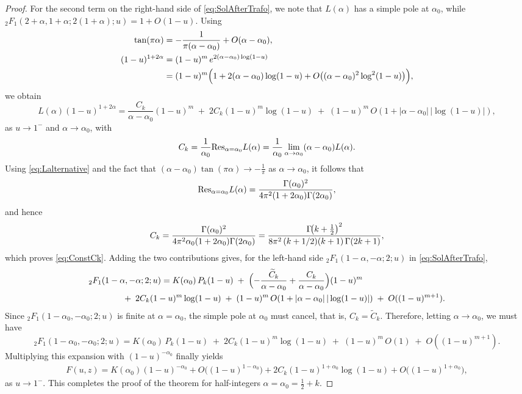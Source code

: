 \documentclass[11pt,a4paper]{article}
\numberwithin{equation}{section}
\begin{document}
\begin{proof}
For the second term on the right-hand side of \eqref{eq:SolAfterTrafo}, we note that $L(\alpha)$ has a simple pole at $\alpha_0$, while ${}_2F_1(2+\alpha,1+\alpha;2(1+\alpha);u)=1+O(1-u)$. Using
\begin{align*}
    \tan(\pi\alpha) &= -\frac{1}{\pi(\alpha-\alpha_0)}+ O(\alpha-\alpha_0),\\
    (1-u)^{1+2\alpha} &= (1-u)^m\,e^{2(\alpha-\alpha_0)\log(1-u)} \\
    &= (1-u)^m\Bigl(1+2(\alpha-\alpha_0)\log(1-u)+O\bigl((\alpha-\alpha_0)^2\log^2(1-u)\bigr)\Bigr),
\end{align*}
we obtain
\begin{equation*}
L(\alpha)(1-u)^{1+2\alpha}
= \frac{C_k}{\alpha-\alpha_0}(1-u)^m \;+\; 2C_k(1-u)^m\log(1-u)
\;+\; (1-u)^m\,O(1+|\alpha-\alpha_0|\,|\log(1-u)|),
\end{equation*}
as $u\to 1^-$ and $\alpha\to\alpha_0$, with
\begin{align*}
C_k={1\over\alpha_0}{\rm Res}_{\alpha=\alpha_0}L(\alpha) = {1\over\alpha_0}\lim_{\alpha\to\alpha_0}(\alpha-\alpha_0)L(\alpha).
\end{align*}
Using \eqref{eq:Lalternative} and the fact that $(\alpha-\alpha_0)\tan(\pi\alpha)\to -\tfrac{1}{\pi}$ as $\alpha\to\alpha_0$, it follows that
$$
{\rm Res}_{\alpha=\alpha_0}L(\alpha) = {\Gamma(\alpha_0)^2\over 4\pi^2(1+2\alpha_0)\Gamma(2\alpha_0)},
$$
and hence
$$
C_k = {\Gamma(\alpha_0)^2\over 4\pi^2\alpha_0(1+2\alpha_0)\Gamma(2\alpha_0)} =\frac{\Gamma\!\bigl(k+\tfrac12\bigr)^2}{8\pi^2\,(k+1/2)(k+1)\,\Gamma(2k+1)},
$$
which proves \eqref{eq:ConstCk}. Adding the two contributions gives, for the left-hand side ${}_2F_1(1-\alpha,-\alpha;2;u)$ in \eqref{eq:SolAfterTrafo},
\begin{align*}
&{}_2F_1(1-\alpha,-\alpha;2;u)
= K(\alpha_0)\,P_k(1-u)
\;+\; \Bigl(-\frac{\widetilde{C}_k}{\alpha-\alpha_0}+\frac{C_k}{\alpha-\alpha_0}\Bigr)(1-u)^m\\
&\qquad\qquad +\; 2C_k(1-u)^m\log(1-u)
\;+\; (1-u)^m\,O(1+|\alpha-\alpha_0|\,|\log(1-u)|)
\;+\; O((1-u)^{m+1}).
\end{align*}
Since ${}_2F_1(1-\alpha_0,-\alpha_0;2;u)$ is finite at $\alpha=\alpha_0$, the simple pole at $\alpha_0$ must cancel, that is, $C_k=\widetilde{C}_k$. Therefore, letting $\alpha\to\alpha_0$, we must have
\begin{equation*}
{}_2F_1(1-\alpha_0,-\alpha_0;2;u)
= K(\alpha_0)\,P_k(1-u) \;+\; 2C_k(1-u)^m\log(1-u) \;+\; (1-u)^m\,O(1) \;+\; O((1-u)^{m+1}).
\end{equation*}
Multiplying this expansion with $(1-u)^{-\alpha_0}$ finally yields
\begin{align*}
F(u,z) 
= K(\alpha_0)(1-u)^{-\alpha_0} + O\bigl((1-u)^{1-\alpha_0}\bigr)
+ 2C_k(1-u)^{1+\alpha_0}\log(1-u) + O\bigl((1-u)^{1+\alpha_0}\bigr),    
\end{align*}
as $u\to 1^-$. This completes the proof of the theorem for half-integers $\alpha=\alpha_0=\tfrac{1}{2}+k$.
\end{proof}
\end{document}
